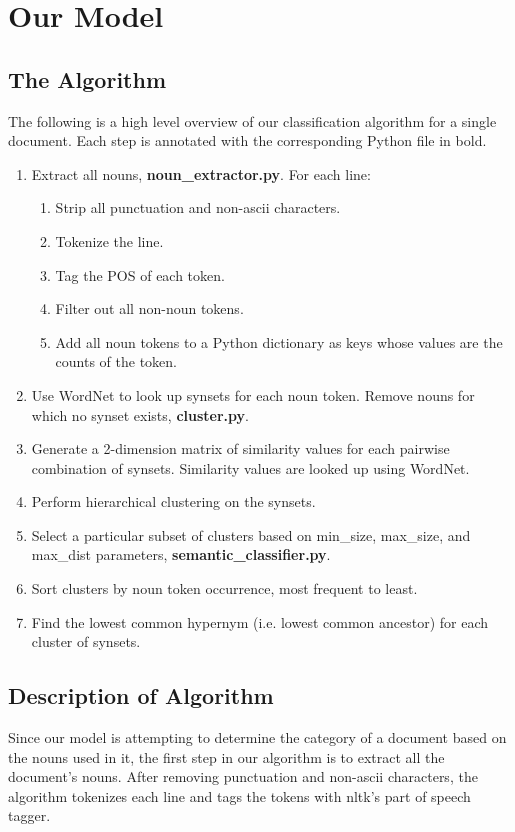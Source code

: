 \documentclass[12pt]{article}
\begin{document}
\section{Our Model}\label{model}

\subsection{The Algorithm}

The following is a high level overview of our classification algorithm for a single document. Each step is annotated with the corresponding Python file in bold.

\begin{enumerate}  
\item Extract all nouns, \textbf{noun\_extractor.py}. For each line:
\begin{enumerate}
\item Strip all punctuation and non-ascii characters.
\item Tokenize the line.
\item Tag the POS of each token.
\item Filter out all non-noun tokens.
\item Add all noun tokens to a Python dictionary as keys whose values are the counts of the token.
\end{enumerate}
\item Use WordNet to look up synsets for each noun token. Remove nouns for which no synset exists, \textbf{cluster.py}.
\item Generate a 2-dimension matrix of similarity values for each pairwise combination of synsets. Similarity values are looked up using WordNet.
\item Perform hierarchical clustering on the synsets.
\item Select a particular subset of clusters based on min\_size, max\_size, and max\_dist parameters, \textbf{semantic\_classifier.py}.
\item Sort clusters by noun token occurrence, most frequent to least.
\item Find the lowest common hypernym (i.e. lowest common ancestor) for each cluster of synsets.
\end{enumerate}

\subsection{Description of Algorithm}

Since our model is attempting to determine the category of a document based on the nouns used in it, the first step in our algorithm is to extract all the document's nouns. After removing punctuation and non-ascii characters, the algorithm tokenizes each line and tags the tokens with nltk's part of speech tagger. 
\end{document}
